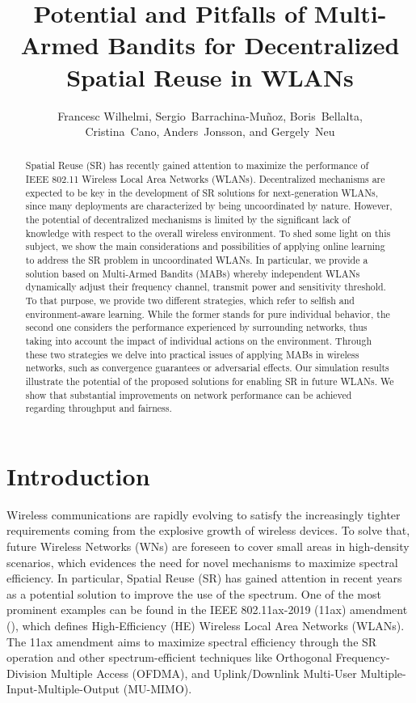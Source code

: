 \documentclass{article}
\begin{document}
\title{Potential and Pitfalls of Multi-Armed Bandits for Decentralized Spatial Reuse in WLANs}
\author{Francesc Wilhelmi, Sergio~Barrachina-Mu\~noz, Boris~Bellalta,\\ Cristina~Cano, Anders~Jonsson, and Gergely~Neu}
\date{ }
\maketitle
\begin{abstract}
Spatial Reuse (SR) has recently gained attention to maximize the performance of IEEE 802.11 Wireless Local Area Networks (WLANs). Decentralized mechanisms are expected to be key in the development of SR solutions for next-generation WLANs, since many deployments are characterized by being uncoordinated by nature. However, the potential of decentralized mechanisms is limited by the significant lack of knowledge with respect to the overall wireless environment. To shed some light on this subject, we show the main considerations and possibilities of applying online learning to address the SR problem in uncoordinated WLANs. In particular, we provide a solution based on Multi-Armed Bandits (MABs) whereby independent WLANs dynamically adjust their frequency channel, transmit power and sensitivity threshold. To that purpose, we provide two different strategies, which refer to selfish and environment-aware learning. While the former stands for pure individual behavior, the second one considers the performance experienced by surrounding networks, thus taking into account the impact of individual actions on the environment. Through these two strategies we delve into practical issues of applying MABs in wireless networks, such as convergence guarantees or adversarial effects. Our simulation results illustrate the potential of the proposed solutions for enabling SR in future WLANs. We show that substantial improvements on network performance can be achieved regarding throughput and fairness.
\end{abstract}

\section{Introduction}
\label{section:introduction}
Wireless communications are rapidly evolving to satisfy the increasingly tighter requirements coming from the explosive growth of wireless devices. To solve that, future Wireless Networks (WNs) are foreseen to cover small areas in high-density scenarios, which evidences the need for novel mechanisms to maximize spectral efficiency. In particular, Spatial Reuse (SR) has gained attention in recent years as a potential solution to improve the use of the spectrum. One of the most prominent examples can be found in the IEEE 802.11ax-2019 (11ax) amendment (\citealp{bellalta2016ax}), which defines High-Efficiency (HE) Wireless Local Area Networks (WLANs). The 11ax amendment aims to maximize spectral efficiency through the SR operation and other spectrum-efficient techniques like Orthogonal Frequency-Division Multiple Access (OFDMA), and Uplink/Downlink Multi-User Multiple-Input-Multiple-Output (MU-MIMO).
\end{document}
